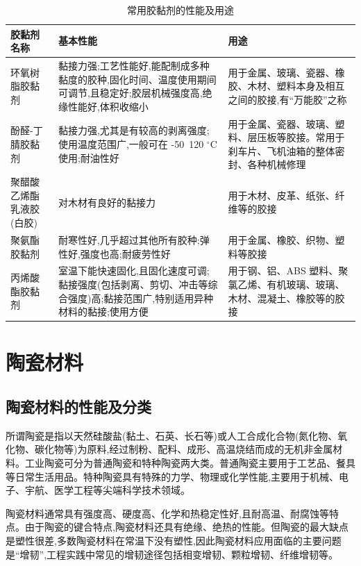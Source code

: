 \documentclass[UTF8]{ctexbook}
\newcommand{\◎}{\ensuremath{\bigcirc}}
\begin{document}
\begin{table}[H]
\centering
\caption{常用胶黏剂的性能及用途}
\label{tab:adhesive_properties}
\begin{tabular}{|p{3cm}|p{4.5cm}|p{6.5cm}|}
\hline
胶黏剂名称 & 基本性能 & 用途 \\
\hline
环氧树脂胶黏剂 & 黏接力强;工艺性能好,能配制成多种黏度的胶种,固化时间、温度使用期间可调节,且稳定好;胶层机械强度高,绝缘性能好,体积收缩小 & 用于金属、玻璃、瓷器、橡胶、木材、塑料本身及相互之间的胶接,有“万能胶”之称 \\
\hline
酚醛-丁腈胶黏剂 & 黏接力强,尤其是有较高的剥离强度;使用温度范围广,一般可在 -50~120 $^\circ$C 使用;耐油性好 & 用于金属、瓷器、玻璃、塑料、层压板等胶接。常用于刹车片、飞机油箱的整体密封、各种机械修理 \\
\hline
聚醋酸乙烯酯乳液胶(白胶) & 对木材有良好的黏接力 & 用于木材、皮革、纸张、纤维等的胶接 \\
\hline
聚氨酯胶黏剂 & 耐寒性好,几乎超过其他所有胶种;弹性好,强度也高;耐疲劳性好 & 用于金属、橡胶、织物、塑料等胶接 \\
\hline
丙烯酸酯胶黏剂 & 室温下能快速固化,且固化速度可调;黏接强度(包括剥离、剪切、冲击等综合强度)高;黏接范围广,特别适用异种材料的黏接;使用方便 & 用于钢、铝、ABS 塑料、聚氯乙烯、有机玻璃、玻璃、木材、混凝土、橡胶等的胶接 \\
\hline
\end{tabular}
\end{table}

\section{陶瓷材料}

\subsection{陶瓷材料的性能及分类}

所谓陶瓷是指以天然硅酸盐(黏土、石英、长石等)或人工合成化合物(氮化物、氧化物、碳化物等)为原料,经过制粉、配料、成形、高温烧结而成的无机非金属材料。工业陶瓷可分为普通陶瓷和特种陶瓷两大类。普通陶瓷主要用于工艺品、餐具等日常生活用品。特种陶瓷具有特殊的力学、物理或化学性能,主要用于机械、电子、宇航、医学工程等尖端科学技术领域。

陶瓷材料通常具有强度高、硬度高、化学和热稳定性好,且耐高温、耐腐蚀等特点。由于陶瓷的键合特点,陶瓷材料还具有绝缘、绝热的性能。但陶瓷的最大缺点是塑性很差,多数陶瓷材料在常温下没有塑性,因此陶瓷材料应用面临的主要问题是“增韧”,工程实践中常见的增韧途径包括相变增韧、颗粒增韧、纤维增韧等。
\end{document}
